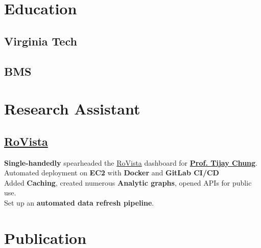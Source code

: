 \documentclass[]{resume-openfont}
\begin{document}
\begin{minipage}[t]{0.33\textwidth}


\section{Education}

\subsection{Virginia Tech}
\sectionsep

\subsection{BMS}
\sectionsep


\section{Research Assistant}
\subsection{\href{https://rovista.netsecurelab.org/}{RoVista}}
\vspace{\topsep} %

\textbullet{} \textbf{Single-handedly} spearheaded the \href{https://rovista.netsecurelab.org/}{RoVista} dashboard for \href{mailto:tijay@vt.edu}{\textbf{Prof. Tijay Chung}}. \\
\textbullet{} Automated deployment on \textbf{EC2} with \textbf{Docker} and \textbf{GitLab CI/CD} \\
\textbullet{} Added \textbf{Caching}, created numerous \textbf{Analytic graphs}, opened APIs for public use. \\
\textbullet{} Set up an \textbf{automated data refresh pipeline}.

\sectionsep

\section{Publication}

\end{minipage}
\end{document}
